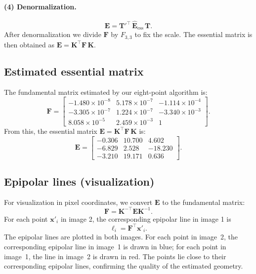 \documentclass{article}
\begin{document}
\paragraph{(4) Denormalization.}
\begin{equation}
\mathbf{E} = \mathbf{T}'^\top\,\hat{\mathbf{E}}_{\text{ess}}\,\mathbf{T}.
\label{eq:E_denorm}
\end{equation}
After denormalization we divide $\mathbf{F}$ by $F_{3,3}$ to fix the scale. The essential matrix is then obtained as $\mathbf{E} = \mathbf{K}^\top \mathbf{F}\, \mathbf{K}$.

\subsection{Estimated essential matrix}
The fundamental matrix estimated by our eight-point algorithm is:
\begin{equation}
\mathbf{F}=
\begin{bmatrix}
-1.480\times 10^{-8} &  5.178\times 10^{-7} & -1.114\times 10^{-4} \\
-3.305\times 10^{-7} &  1.224\times 10^{-7} & -3.340\times 10^{-3} \\
 8.058\times 10^{-5} &  2.459\times 10^{-3} &  1
\end{bmatrix}.
\end{equation}
From this, the essential matrix $\mathbf{E}=\mathbf{K}^\top\mathbf{F}\,\mathbf{K}$ is:
\begin{equation}
\mathbf{E}=
\begin{bmatrix}
-0.306 &  10.700 &  4.602 \\
-6.829 &   2.528 & -18.230 \\
-3.210 &  19.171 &   0.636
\end{bmatrix}.
\label{eq:E_num}
\end{equation}

\subsection{Epipolar lines (visualization)}
For visualization in pixel coordinates, we convert $\mathbf{E}$ to the fundamental matrix:
\[
\mathbf{F}=\mathbf{K}^{-\top}\mathbf{E}\mathbf{K}^{-1}.
\]
For each point $\mathbf{x}'_i$ in image 2, the corresponding epipolar line in image 1 is
\[
\boldsymbol{\ell}_i=\mathbf{F}^\top \mathbf{x}'_i.
\]
The epipolar lines are plotted in both images. For each point in image~2, the corresponding epipolar line in image~1 is drawn in blue; for each point in image~1, the line in image~2 is drawn in red. The points lie close to their corresponding epipolar lines, confirming the quality of the estimated geometry.
\end{document}
